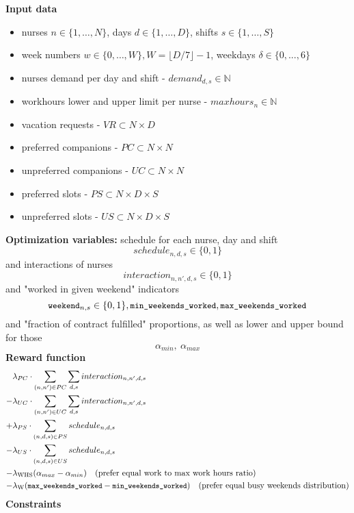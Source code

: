 \documentclass{article}
\newcommand{\N}{\mathbb{N}}
\newcommand{\varWeekendWorkedIndicator}[2]{\texttt{\small weekend}_{#1, #2}}
\newcommand{\varMinWeekendsWorked}{\texttt{\small min\_weekends\_worked}}
\newcommand{\varMaxWeekendsWorked}{\texttt{\small max\_weekends\_worked}}
\begin{document}
\noindent \textbf{Input data}
\begin{itemize}
    \item nurses $n\in \{1, \dots, N\}$, days $d\in \{1, \dots, D\}$, shifts $s\in \{1, \dots, S\}$
    \item week numbers $w\in\{0, \dots, W\}, W=\lfloor D/7 \rfloor - 1$, weekdays $\delta \in \{0, ..., 6\}$
    \item nurses demand per day and shift - $demand_{d,s} \in \N$
    \item workhours lower and upper limit per nurse - $maxhours_n \in \N$
    \item vacation requests - $VR \subset N \times D$
    \item preferred companions - $PC \subset N \times N$
    \item unpreferred companions - $UC \subset N \times N$
    \item preferred slots - $PS \subset N \times D \times S$
    \item unpreferred slots - $US \subset N \times D \times S$
\end{itemize}
\textbf{Optimization variables:} schedule for each nurse, day and shift 
$$schedule_{n,d,s} \in \{0,1\}$$
and interactions of nurses \quad {}
$$interaction_{n,n',d,s} \in \{0,1\}$$
and "worked in given weekend" indicators
$$\varWeekendWorkedIndicator{n}{s} \in \{0, 1\}, \varMinWeekendsWorked, \varMaxWeekendsWorked$$
and "fraction of contract fulfilled" proportions, as well as lower and upper bound for those
$$\alpha_{min},\ \alpha_{max}$$
\textbf{Reward function}
\begin{align*}
     &\lambda_{PC}\cdot\sum_{(n, n')\in PC}\sum_{d,s} interaction_{n,n',d,s} \\
    -&\lambda_{UC}\cdot\sum_{(n, n')\in UC}\sum_{d,s} interaction_{n,n',d,s} \\ 
    +&\lambda_{PS}\cdot\sum_{(n, d, s)\in PS} schedule_{n,d,s} \\ 
    -&\lambda_{US}\cdot\sum_{(n, d, s)\in US} schedule_{n,d,s} \\
    -&\lambda_\text{WHS} (\alpha_{max} - \alpha_{min})\quad \text{(prefer equal work to max work hours ratio)} \\
    -&\lambda_\text{W} (\varMaxWeekendsWorked - \varMinWeekendsWorked)\quad \text{(prefer equal busy weekends distribution)}
\end{align*}
\textbf{Constraints}
\end{document}
